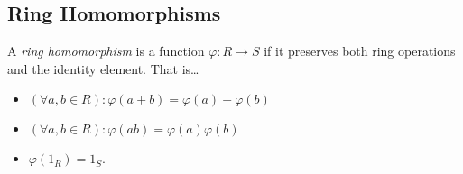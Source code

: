 \subsection{Ring Homomorphisms}\label{ringhomomorphisms}
A \emph{ring homomorphism} is a function $\varphi: R \rightarrow S$ if it preserves both ring operations
and the identity element. That is\dots
\begin{itemize}
  \item $(\forall a,b \in R): \varphi(a + b) = \varphi(a) + \varphi(b)$
  \item $(\forall a,b \in R): \varphi(ab) = \varphi(a)\varphi(b)$
  \item $\varphi(1_R) = 1_S.$
\end{itemize}